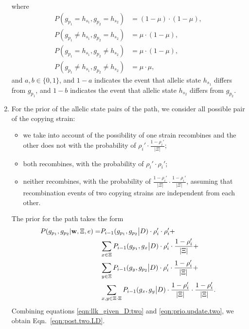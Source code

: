 \documentclass{bioinfo}
\begin{document}
\begin{enumerate}
\begin{equation}
\end{equation}
where
\begin{align*}
P(g_{p_1} = h_{s_1}, g_{p_2} = h_{s_2})       & = (1-\mu)\cdot(1-\mu) , \\
P(g_{p_1} \neq h_{s_1}, g_{p_2} = h_{s_2})    & = \mu\cdot(1-\mu),\\
P(g_{p_1} = h_{s_1}, g_{p_2} \neq h_{s_2})    & = \mu\cdot(1-\mu),\\
P(g_{p_1} \neq h_{s_1}, g_{p_2} \neq h_{s_2}) & = \mu \cdot \mu,
\end{align*}
and $a,b \in \{0, 1\}$, and $1-a$ indicates the event that allelic state $h_{s_1}$ differs from $g_{p_1}$, and $1-b$ indicates the event that allelic state $h_{s_2}$ differs from $g_{p_2}$.

\item
For the prior of the allelic state pairs of the path, we consider all possible pair of the copying strain:
\begin{itemize}
\item we take into account of the possibility of one strain recombines and the other does not with the probability of $\rho_i' \cdot \frac{1-\rho_i'}{|\Xi|}$; 
\item both recombines, with the probability of $\rho_i' \cdot \rho_i'$; 
\item neither recombines, with the probability of $\frac{1-\rho_i'}{|\Xi|} \cdot\frac{1-\rho_i'}{|\Xi|}$, assuming that recombination events of two copying strains are independent from each other. 
\end{itemize}
The prior for the path takes the form
\begin{equation}
\begin{split}
P(g_{p_1}, g_{p_2}|\mathbf{w}, \Xi, e) = &  P_{i-1}(g_{p_1},g_{p_2}\big{|}D) \cdot \rho_i' \cdot \rho_i' + \\
                                         & \sum_{x\in \Xi} P_{i-1}(g_{p_1},g_{x}\big{|}D) \cdot \rho_i' \cdot \frac{1-\rho_i'}{|\Xi|} + \\
                                         & \sum_{y\in \Xi} P_{i-1}(g_{y},g_{p_2}\big{|}D) \cdot \rho_i' \cdot\frac{1-\rho_i'}{|\Xi|}+ \\
                                         & \sum_{x,y\in \Xi\cdot \Xi} P_{i-1}(g_{x},g_{y}\big{|}D)  \cdot\frac{1-\rho_i'}{|\Xi|} \cdot\frac{1-\rho_i'}{|\Xi|}. \label{eqn:prio.update.two}
\end{split}
\end{equation}
Combining equations \eqref{eqn:llk_given_D:two} and \eqref{eqn:prio.update.two}, we obtain Eqn.~\eqref{eqn:post.two.LD}.


\end{enumerate}
\end{document}

